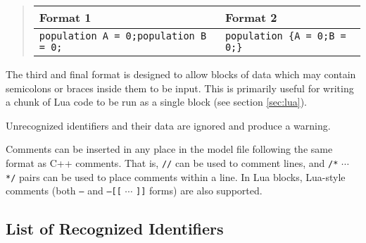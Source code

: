 \documentclass[10pt]{article}
\newcommand{\code}[1]{{\tt {#1}}}
\begin{document}
\begin{quote}
\begin{tabular}{p{1.9in}|p{1.9in}}
Format 1&Format 2\\
\hline
\code{population A = 0;\linebreak[4]population B = 0;\linebreak[4]} &
\code{population \{\linebreak[4]\hspace{0.3in}A = 0;\linebreak[4]\hspace{0.3in}B = 0;\linebreak[4]\}}
\end{tabular}
\end{quote}

The third and final format is designed to allow blocks of data which may contain semicolons or braces inside them to be input. This is primarily useful for writing a chunk of Lua code to be run as a single block (see section \ref{sec:lua}).

Unrecognized identifiers and their data are ignored and produce a warning.

Comments can be inserted in any place in the model file following the same format as C++ comments. That is, \code{//} can be used to comment lines, and \code{/*} $\cdots$ \code{*/} pairs can be used to place comments within a line. In Lua blocks, Lua-style comments (both \code{--} and \code{--[[} $\cdots$ \code{]]} forms) are also supported.

\subsection{List of Recognized Identifiers}
\label{sec:identifiers}
\end{document}
